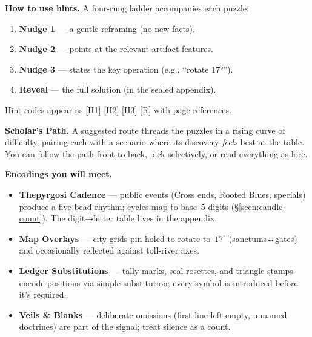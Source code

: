 \documentclass[11pt]{article}
\begin{document}
\medskip
\noindent\textbf{How to use hints.} A four-rung ladder accompanies each puzzle:
\begin{enumerate}\setlength\itemsep{0.25em}
  \item \textbf{Nudge 1} — a gentle reframing (no new facts).
  \item \textbf{Nudge 2} — points at the relevant artifact features.
  \item \textbf{Nudge 3} — states the key operation (e.g., “rotate 17°”).
  \item \textbf{Reveal} — the full solution (in the sealed appendix).
\end{enumerate}
Hint codes appear as \textsc{[H1] [H2] [H3] [R]} with page references.

\medskip
\noindent\textbf{Scholar’s Path.} A suggested route threads the puzzles in a rising curve of difficulty, pairing each with a scenario where its discovery \emph{feels} best at the table. You can follow the path front-to-back, pick selectively, or read everything as lore.

\medskip
\noindent\textbf{Encodings you will meet.}
\begin{itemize}\setlength\itemsep{0.3em}
  \item \textbf{Thepyrgosi Cadence} — public events (Cross ends, Rooted Blues, specials) produce a five-bead rhythm; cycles map to base–5 digits (\S\ref{scen:candle-count}). The digit→letter table lives in the appendix.
  \item \textbf{Map Overlays} — city grids pin-holed to rotate to \(\,17^\circ\) (sanctums↔gates) and occasionally reflected against toll-river axes.
  \item \textbf{Ledger Substitutions} — tally marks, seal rosettes, and triangle stamps encode positions via simple substitution; every symbol is introduced before it’s required.
  \item \textbf{Veils \& Blanks} — deliberate omissions (first-line left empty, unnamed doctrines) are part of the signal; treat silence as a count.
\end{itemize}
\end{document}
